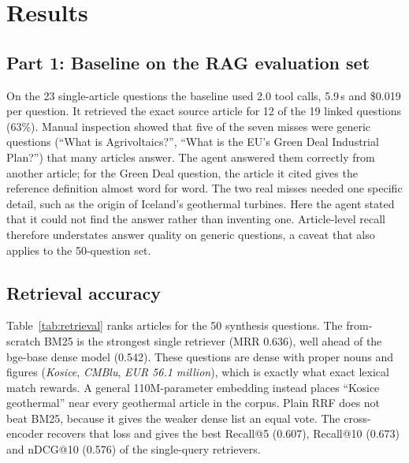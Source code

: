 \section{Results}

\subsection{Part 1: Baseline on the RAG evaluation set}
On the 23 single-article questions the baseline used 2.0 tool calls, 5.9\,s and \$0.019 per question. It
retrieved the exact source article for 12 of the 19 linked questions (63\%). Manual inspection showed that
five of the seven misses were generic questions (``What is Agrivoltaics?'', ``What is the EU's Green Deal
Industrial Plan?'') that many articles answer. The agent answered them correctly from another article; for the
Green Deal question, the article it cited gives the reference definition almost word for word. The two real misses
needed one specific detail, such as the origin of Iceland's geothermal turbines. Here the agent stated that it could
not find the answer rather than inventing one. Article-level recall therefore understates answer quality on
generic questions, a caveat that also applies to the 50-question set.

\subsection{Retrieval accuracy}
Table~\ref{tab:retrieval} ranks articles for the 50 synthesis questions. The from-scratch BM25 is the
strongest single retriever (MRR 0.636), well ahead of the bge-base dense model (0.542). These questions are
dense with proper nouns and figures (\textit{Kosice}, \textit{CMBlu}, \textit{EUR 56.1 million}), which is
exactly what exact lexical match rewards. A general 110M-parameter embedding instead places ``Kosice
geothermal'' near every geothermal article in the corpus. Plain RRF does not beat BM25, because it gives the weaker
dense list an equal vote. The cross-encoder recovers that loss and gives the best Recall@5 (0.607), Recall@10
(0.673) and nDCG@10 (0.576) of the single-query retrievers.


